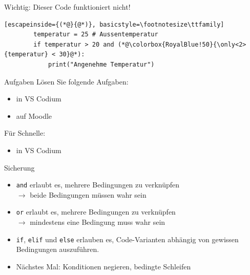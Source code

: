 \begin{frame}[fragile]{Wichtig: Dieser Code funktioniert nicht!}

    \begin{lstlisting}[escapeinside={(*@}{@*)}, basicstyle=\footnotesize\ttfamily]
        temperatur = 25 # Aussentemperatur
        if temperatur > 20 and (*@\colorbox{RoyalBlue!50}{\only<2>{temperatur} < 30}@*):
            print("Angenehme Temperatur")
    \end{lstlisting}
\end{frame}


\begin{frame}{Aufgaben}
    Lösen Sie folgende Aufgaben:
    \begin{itemize}
        \item {} in VS Codium
        \item {} auf Moodle
    \end{itemize}

    Für Schnelle:
    \begin{itemize}
        \item {} in VS Codium
    \end{itemize}
\end{frame}

\begin{frame}{Sicherung}
    \begin{itemize}[<+->]
        \item \faCheckSquare{} \lstinline|and| erlaubt es, mehrere Bedingungen zu verknüpfen\\
        $\rightarrow$ beide Bedingungen müssen wahr sein
        \item \faCheckSquare{} \lstinline|or| erlaubt es, mehrere Bedingungen zu verknüpfen\\
        $\rightarrow$ mindestens eine Bedingung muss wahr sein
        \item \faCheckSquare{} \lstinline|if|, \lstinline|elif| und \lstinline|else| erlauben es, Code-Varianten abhängig von gewissen Bedingungen auszuführen.
        \item \faSquare{} Nächstes Mal: Konditionen negieren, bedingte Schleifen
    \end{itemize}
\end{frame}
